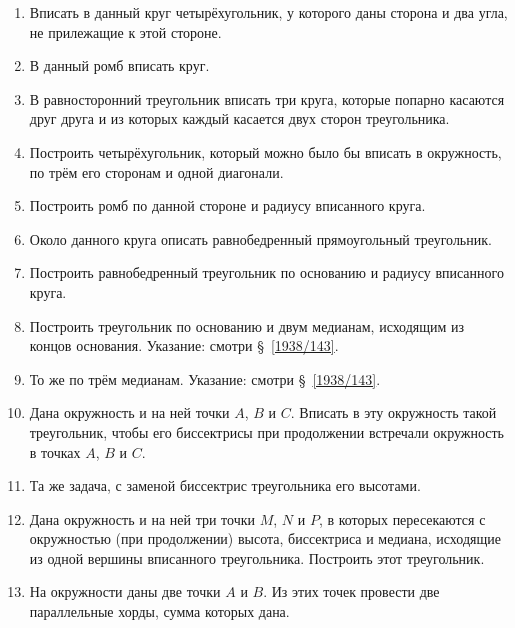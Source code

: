 {\begin{enumerate}
\item
Вписать в данный круг четырёхугольник, у которого даны сторона и два угла, не прилежащие к этой стороне.

\item
В данный ромб вписать круг.

\item
В равносторонний треугольник вписать три круга, которые попарно касаются друг друга и из которых каждый касается двух сторон треугольника.

\item
Построить четырёхугольник, который можно было бы вписать в окружность, по трём его сторонам и одной диагонали.

\item
Построить ромб по данной стороне и радиусу вписанного круга.

\item
Около данного круга описать равнобедренный прямоугольный треугольник.

\item
Построить равнобедренный треугольник по основанию и радиусу вписанного круга.

\item
Построить треугольник по основанию и двум медианам, исходящим из концов основания.
Указание: смотри §~\ref{1938/143}.

\item
То же по трём медианам.
Указание: смотри §~\ref{1938/143}.

\item
Дана окружность и на ней точки $A$, $B$ и $C$.
Вписать в эту окружность такой треугольник, чтобы его биссектрисы при продолжении встречали окружность в точках $A$, $B$ и $C$.

\item
Та же задача, с заменой биссектрис треугольника его высотами.

\item
Дана окружность и на ней три точки $M$, $N$ и $P$, в которых пересекаются с окружностью (при продолжении) высота, биссектриса и медиана, исходящие из одной вершины вписанного треугольника.
Построить этот треугольник.

\item
На окружности даны две точки $A$ и $B$.
Из этих точек провести две параллельные хорды, сумма которых дана.

\end{enumerate}

\begin{center}
\end{center}

}
